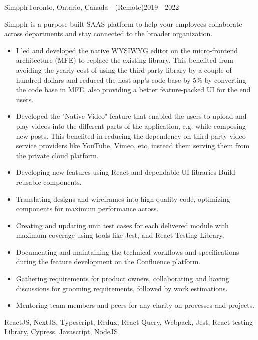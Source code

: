 \begin{projects}
    \project
    {Simpplr}{Toronto, Ontario, Canada - (Remote)}{2019 - 2022}
    {}
    {Simpplr is a purpose-built SAAS platform to help your employees collaborate across departments and stay connected to the broader organization.
    \begin{itemize}
        \item I led and developed the native WYSIWYG editor on the micro-frontend architecture (MFE) to replace the existing library. This benefited from avoiding the yearly cost of using the third-party library by a couple of hundred dollars and reduced the host app's code base by 5\% by converting the code base in MFE, also providing a better feature-packed UI for the end users.
        \item Developed the "Native Video" feature that enabled the users to upload and play videos into the different parts of the application, e.g. while composing new posts. This benefited in reducing the dependency on third-party video service providers like YouTube, Vimeo, etc, instead them serving them from the private cloud platform.
        \item Developing new features using React and dependable UI libraries Build reusable components.
        \item Translating designs and wireframes into high-quality code, optimizing components for maximum performance across.
        \item Creating and updating unit test cases for each delivered module with maximum coverage using tools like Jest, and React Testing Library.
        \item Documenting and maintaining the technical workflows and specifications during the feature development on the Confluence platform.
        \item Gathering requirements for product owners, collaborating and having discussions for grooming requirements, followed by work estimations.
        \item Mentoring team members and peers for any clarity on processes and projects.
    \end{itemize}}
    {ReactJS, NextJS, Typescript, Redux, React Query, Webpack, Jest, React testing Library, Cypress, Javascript, NodeJS}


\end{projects}
